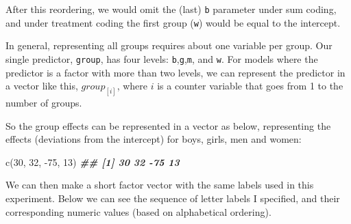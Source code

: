 \documentclass[
]{book}
\newenvironment{Shaded}{\begin{snugshade}}{\end{snugshade}}
\newcommand{\AttributeTok}[1]{\textcolor[rgb]{0.77,0.63,0.00}{#1}}
\newcommand{\CommentTok}[1]{\textcolor[rgb]{0.56,0.35,0.01}{\textit{#1}}}
\newcommand{\DecValTok}[1]{\textcolor[rgb]{0.00,0.00,0.81}{#1}}
\newcommand{\DocumentationTok}[1]{\textcolor[rgb]{0.56,0.35,0.01}{\textbf{\textit{#1}}}}
\newcommand{\FunctionTok}[1]{\textcolor[rgb]{0.00,0.00,0.00}{#1}}
\newcommand{\NormalTok}[1]{#1}
\newcommand{\OtherTok}[1]{\textcolor[rgb]{0.56,0.35,0.01}{#1}}
\newcommand{\SpecialCharTok}[1]{\textcolor[rgb]{0.00,0.00,0.00}{#1}}
\newcommand{\StringTok}[1]{\textcolor[rgb]{0.31,0.60,0.02}{#1}}
\begin{document}
\begin{Shaded}
\end{Shaded}

After this reordering, we would omit the (last) \texttt{b} parameter under sum coding, and under treatment coding the first group (\texttt{w}) would be equal to the intercept.

In general, representing all groups requires about one variable per group. Our single predictor, \texttt{group}, has four levels: \texttt{b},\texttt{g},\texttt{m}, and \texttt{w}. For models where the predictor is a factor with more than two levels, we can represent the predictor in a vector like this, \(group_{[i]}\), where \(i\) is a counter variable that goes from 1 to the number of groups.

So the group effects can be represented in a vector as below, representing the effects (deviations from the intercept) for boys, girls, men and women:

\begin{Shaded}
\begin{Highlighting}[]
\FunctionTok{c}\NormalTok{(}\DecValTok{30}\NormalTok{, }\DecValTok{32}\NormalTok{, }\SpecialCharTok{{-}}\DecValTok{75}\NormalTok{, }\DecValTok{13}\NormalTok{)}
\DocumentationTok{\#\# [1]  30  32 {-}75  13}
\end{Highlighting}
\end{Shaded}

We can then make a short factor vector with the same labels used in this experiment. Below we can see the sequence of letter labels I specified, and their corresponding numeric values (based on alphabetical ordering).
\end{document}
